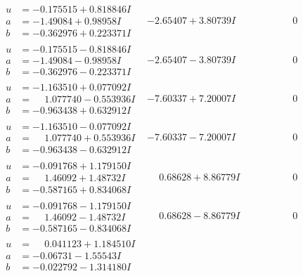 \documentclass[1p]{elsarticle_modified}
\theoremstyle{definition}
\begin{document}
$$\begin{array}{c|c|c}
 \hline 
\begin{aligned}
u &= -0.175515 + 0.818846 I \\
a &= -1.49084 + 0.98958 I \\
b &= -0.362976 + 0.223371 I\end{aligned}
 & -2.65407 + 3.80739 I & \phantom{-0.000000 } 0 \\ \hline\begin{aligned}
u &= -0.175515 - 0.818846 I \\
a &= -1.49084 - 0.98958 I \\
b &= -0.362976 - 0.223371 I\end{aligned}
 & -2.65407 - 3.80739 I & \phantom{-0.000000 } 0 \\ \hline\begin{aligned}
u &= -1.163510 + 0.077092 I \\
a &= \phantom{-}1.077740 - 0.553936 I \\
b &= -0.963438 + 0.632912 I\end{aligned}
 & -7.60337 + 7.20007 I & \phantom{-0.000000 } 0 \\ \hline\begin{aligned}
u &= -1.163510 - 0.077092 I \\
a &= \phantom{-}1.077740 + 0.553936 I \\
b &= -0.963438 - 0.632912 I\end{aligned}
 & -7.60337 - 7.20007 I & \phantom{-0.000000 } 0 \\ \hline\begin{aligned}
u &= -0.091768 + 1.179150 I \\
a &= \phantom{-}1.46092 + 1.48732 I \\
b &= -0.587165 + 0.834068 I\end{aligned}
 & \phantom{-}0.68628 + 8.86779 I & \phantom{-0.000000 } 0 \\ \hline\begin{aligned}
u &= -0.091768 - 1.179150 I \\
a &= \phantom{-}1.46092 - 1.48732 I \\
b &= -0.587165 - 0.834068 I\end{aligned}
 & \phantom{-}0.68628 - 8.86779 I & \phantom{-0.000000 } 0 \\ \hline\begin{aligned}
u &= \phantom{-}0.041123 + 1.184510 I \\
a &= -0.06731 - 1.55543 I \\
b &= -0.022792 - 1.314180 I\end{aligned}

\end{array}$$
\end{document}
